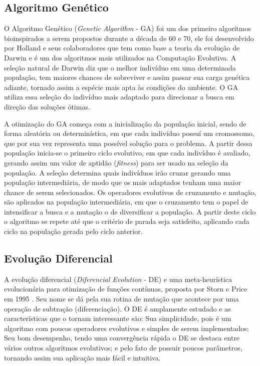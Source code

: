 \subsection{Algoritmo Genético}
\label{sec:genetic_algorithms}
O Algoritmo Genético (\textit{Genetic Algorithm} - GA) foi um dos primeiro algoritmos bioinspirados a serem propostos durante a década de 60 e 70, ele foi desenvolvido por Holland e seus colaboradores que tem como base a teoria da evolução de Darwin \cite{ga} e é um dos algoritmos mais utilizados na Computação Evolutiva. A seleção natural de Darwin diz que o melhor indivíduo em uma determinada população, tem maiores chances de sobreviver e assim passar sua carga genética adiante, tornado assim a espécie mais apta às condições do ambiente. O GA utiliza essa seleção do indivíduo mais adaptado para direcionar a busca em direção das soluções ótimas.

A otimização do GA começa com a inicialização da população inicial, sendo de forma aleatória ou determinística, em que cada indivíduo possuí um cromossomo, que por sua vez representa uma possível solução para o problema. A partir dessa população inicia-se o primeiro ciclo evolutivo, em que cada indivíduo é avaliado, gerando assim um valor de aptidão (\textit{fitness}) para ser usado na seleção da população. A seleção determina quais indivíduos irão cruzar gerando uma população intermediária, de modo que os mais adaptados tenham uma maior chance de serem selecionados. Os operadores evolutivos de cruzamento e mutação, são aplicados na população intermediária, em que o cruzamento tem o papel de intensificar a busca e a mutação o de diversificar a população. A partir deste ciclo o algoritmo se repete até que o critério de parada seja satisfeito, aplicando cada ciclo na população gerada pelo ciclo anterior.

\subsection{Evolução Diferencial}
\label{sec:diferencial_evolution}
A evolução diferencial (\textit{Diferencial Evolution} - DE) e uma meta-heurística evolucionária para otimização de funções contínuas, proposta por Storn e Price em 1995 \cite{de}. Seu nome se dá pela sua rotina de mutação que acontece por uma operação de subtração (diferenciação). O DE é amplamente estudado e as características que o tornam interessante são: Sua simplicidade, pois é um algoritmo com poucos operadores evolutivos e simples de serem implementados; Seu bom desempenho, tendo uma convergência rápida o DE se destaca entre vários outros algoritmos evolutivos; e pelo fato de possuir poucos parâmetros, tornando assim sua aplicação mais fácil e intuitiva.


